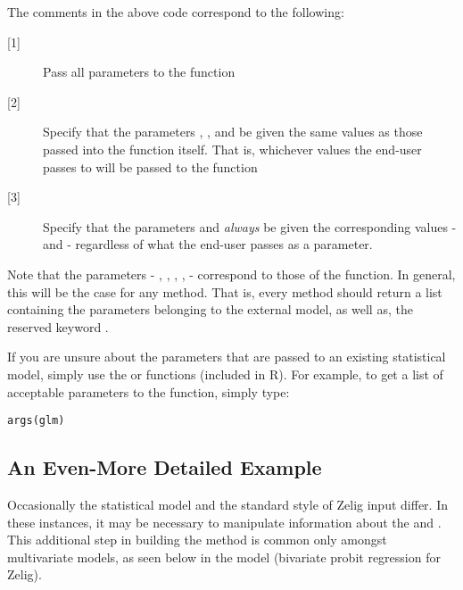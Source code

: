 \noindent The comments in the above code correspond to the following:

\begin{description}
	\item[{[1]}] Pass all parameters to the  function

	\item[{[2]}] Specify that the parameters , , and  be given the same values as those passed into the  function itself. That is, whichever values the end-user passes to  will be passed to the  function

	\item[{[3]}] Specify that the parameters  and  \emph{always} be given the corresponding values -  and  - regardless of what the end-user passes as a parameter.
	
\end{description}

Note that the parameters - , , , ,  - correspond to those of the  function. In general, this will be the case for any  method. That is, every  method should return a list containing the parameters belonging to the external model, as well as, the reserved keyword .

If you are unsure about the parameters that are passed to an existing statistical model, simply use the  or  functions (included in R). For example, to get a list of acceptable parameters to the  function, simply type:

\begin{verbatim}
args(glm)
\end{verbatim}


\subsection{An Even-More Detailed Example}

{\noindent}Occasionally the statistical model and the standard style of Zelig input differ. In these instances, it may be necessary to manipulate information about the  and . This additional step in building the  method is common only amongst multivariate models, as seen below in the  model (bivariate probit regression for Zelig).


